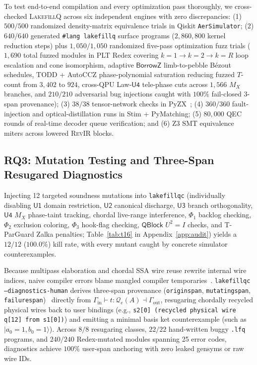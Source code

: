 \documentclass[acmsmall,screen,anonymous]{acmart}
\DeclareRobustCommand{\_}{\ifmmode\text{\char95}\else\char95\penalty0\relax\fi}
\theoremstyle{plain}
\newcommand{\LakefillQ}{\textsc{LakefillQ}}
\newcommand{\RevIR}{\textsc{RevIR}}
\newcommand{\QBlock}{\ensuremath{\mathsf{QBlock}}}
\newcommand{\CapBorrowZ}{\ensuremath{\mathsf{BorrowZ}}}
\begin{document}
To test end-to-end compilation and every optimization pass thoroughly, we cross-checked \LakefillQ{} across six independent engines with zero discrepancies: (1) $500/500$ randomized density-matrix equivalence trials in Qiskit \texttt{AerSimulator}; (2) $640/640$ generated \texttt{\#lang lakefillq} surface programs ($2{,}860{,}800$ kernel reduction steps) plus $1{,}050/1{,}050$ randomized five-pass optimization fuzz trials ($1{,}690$ total fuzzed modules in PLT Redex covering $k=1 \to k=2 \to k=R$ loop escalation and cone isomorphism, adaptive $\CapBorrowZ$ limb-to-pebble B\'{e}zout schedules, TODD + AutoCCZ phase-polynomial saturation reducing fuzzed $T$-count from $3{,}402$ to $924$, cross-QPU Law-$\mathsf{U4}$ tele-phase cuts across $1{,}566$ $M_X$ branches, and $210/210$ adversarial bug injections caught with $100\%$ fail-closed 3-span provenance); (3) $38/38$ tensor-network checks in PyZX~\cite{duncan2020,kissinger2020tcount}; (4) $360/360$ fault-injection and optical-distillation runs in Stim + PyMatching; (5) $80{,}000$ QEC rounds of real-time decoder queue verification; and (6) Z3 SMT equivalence miters across lowered \RevIR{} blocks.

\subsection{RQ3: Mutation Testing and Three-Span Resugared Diagnostics}
\label{sec:multipass_diag}

Injecting 12 targeted soundness mutations into \texttt{lakefillqc} (individually disabling $\mathsf{U1}$ domain restriction, $\mathsf{U2}$ canonical discharge, $\mathsf{U3}$ branch orthogonality, $\mathsf{U4}$ $M_X$ phase-taint tracking, chordal live-range interference, $\Phi_1$ backlog checking, $\Phi_2$ exclusion coloring, $\Phi_3$ hook-flag checking, $\QBlock$ $U^2 = I$ checks, and \textsf{T-ParGuard} Zalka penalties; Table~\ref{tab:t16} in Appendix~\ref{app:audit}) yields a $12/12$ ($100.0\%$) kill rate, with every mutant caught by concrete simulator counterexamples.

Because multipass elaboration and chordal SSA wire reuse rewrite internal wire indices, naive compiler errors blame mangled compiler temporaries~\cite{culpepper2012fortifying,keep2013nanopass,pombrio2018inferring}. \texttt{lakefillqc --diagnostics-human} derives three-span provenance (\texttt{origin\_span}, \texttt{mutating\_span}, \texttt{failure\_span})~\cite{seidel2016dynamic,zhang2014sherrloc,pavlinovic2014minimum,marceau2011measuring,heeren2003scripting} directly from $\Gamma_{\mathrm{in}} \vdash t : \mathcal{Q}_{e}(A) \dashv \Gamma_{\mathrm{out}}$, resugaring chordally recycled physical wires back to user bindings (e.g., \texttt{s2[0] (recycled physical wire q[12] from s1[0])}) and emitting a minimal basis ket counterexample (such as $|a_0 = 1, b_0 = 1\rangle$). Across $8/8$ resugaring classes, $22/22$ hand-written buggy \texttt{.lfq} programs, and $240/240$ Redex-mutated modules spanning 25 error codes, diagnostics achieve $100\%$ user-span anchoring with zero leaked gensyms or raw wire IDs.
\end{document}

